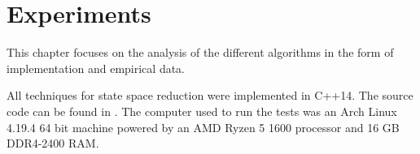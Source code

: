 \chapter{Experiments}

This chapter focuses on the analysis of the different algorithms in the form of implementation and empirical data.

All techniques for state space reduction were implemented in C++14. The source code can be found in \cite{}. The computer used to run the tests was an Arch Linux 4.19.4 64 bit machine powered by an AMD Ryzen 5 1600 processor and 16 GB DDR4-2400 RAM.














